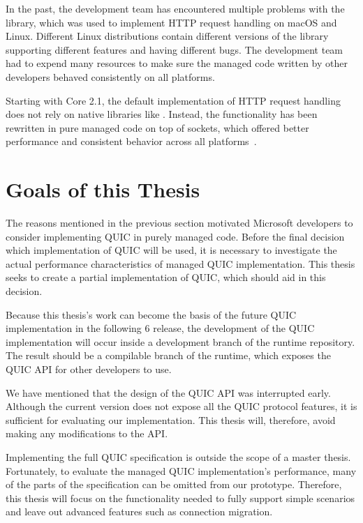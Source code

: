 In the past, the \dotnet{} development team has encountered multiple problems with the
\libcurl~\cite{curlGithub} library, which was used to implement HTTP request handling on macOS and
Linux. Different Linux distributions contain different versions of the \libcurl{} library supporting
different features and having different bugs. The \dotnet{} development team had to expend many
resources to make sure the managed code written by other \dotnet{} developers behaved consistently
on all platforms.

Starting with \dotnet{} Core 2.1, the default implementation of HTTP request handling does not rely
on native libraries like \libcurl{}. Instead, the functionality has been rewritten in pure managed
code on top of sockets, which offered better performance and consistent behavior across all
\dotnet{} platforms~\cite{SocketsHttpHandlerDocs}.

\section{Goals of this Thesis}

The reasons mentioned in the previous section motivated Microsoft developers to consider
implementing QUIC in purely managed \csharp{} code. Before the final decision which implementation
of QUIC will be used, it is necessary to investigate the actual performance characteristics of
managed QUIC implementation. This thesis seeks to create a partial implementation of QUIC, which
should aid in this decision.

Because this thesis's work can become the basis of the future QUIC implementation in the following
\dotnet{} 6 release, the development of the QUIC implementation will occur inside a development
branch of the \dotnet{} runtime repository. The result should be a compilable branch of the runtime,
which exposes the QUIC API for other \dotnet{} developers to use.

We have mentioned that the design of the QUIC API was interrupted early. Although the current
version does not expose all the QUIC protocol features, it is sufficient for evaluating our
implementation. This thesis will, therefore, avoid making any modifications to the API\@.

Implementing the full QUIC specification is outside the scope of a master thesis. Fortunately, to
evaluate the managed QUIC implementation's performance, many of the parts of the specification can
be omitted from our prototype. Therefore, this thesis will focus on the functionality needed to
fully support simple scenarios and leave out advanced features such as connection migration.

